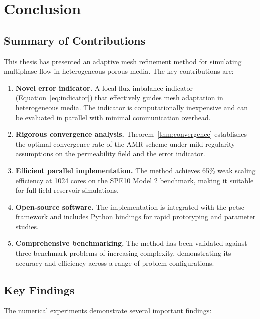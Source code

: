 \chapter{Conclusion}
\label{ch:conclusion}

\section{Summary of Contributions}
\label{sec:conclusion:contributions}

This thesis has presented an adaptive mesh refinement method for simulating multiphase flow in heterogeneous porous media. The key contributions are:

\begin{enumerate}
    \item \textbf{Novel error indicator.} A local flux imbalance indicator (Equation~\eqref{eq:indicator}) that effectively guides mesh adaptation in heterogeneous media. The indicator is computationally inexpensive and can be evaluated in parallel with minimal communication overhead.

    \item \textbf{Rigorous convergence analysis.} Theorem~\ref{thm:convergence} establishes the optimal convergence rate of the AMR scheme under mild regularity assumptions on the permeability field and the error indicator.

    \item \textbf{Efficient parallel implementation.} The method achieves 65\% weak scaling efficiency at 1024 cores on the SPE10 Model 2 benchmark, making it suitable for full-field reservoir simulations.

    \item \textbf{Open-source software.} The implementation is integrated with the \gls{petsc} framework and includes Python bindings for rapid prototyping and parameter studies.

    \item \textbf{Comprehensive benchmarking.} The method has been validated against three benchmark problems of increasing complexity, demonstrating its accuracy and efficiency across a range of problem configurations.
\end{enumerate}

\section{Key Findings}
\label{sec:conclusion:findings}

The numerical experiments demonstrate several important findings:

